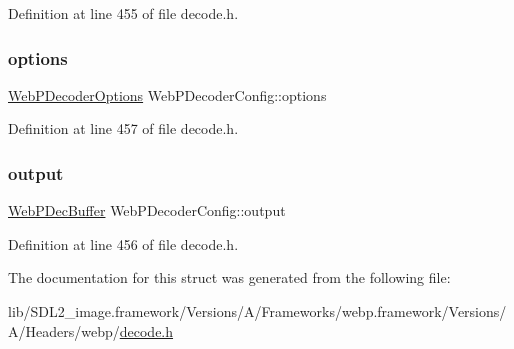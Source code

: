 Definition at line 455 of file decode.\+h.

\mbox{\label{struct_web_p_decoder_config_a06921f434d359574eba37f6aedd33a6a}} 
\subsubsection{\texorpdfstring{options}{options}}
{\footnotesize\ttfamily \mbox{\hyperlink{struct_web_p_decoder_options}{Web\+P\+Decoder\+Options}} Web\+P\+Decoder\+Config\+::options}



Definition at line 457 of file decode.\+h.

\mbox{\label{struct_web_p_decoder_config_abd6e5ba792753fae7e8a123323f343b4}} 
\subsubsection{\texorpdfstring{output}{output}}
{\footnotesize\ttfamily \mbox{\hyperlink{struct_web_p_dec_buffer}{Web\+P\+Dec\+Buffer}} Web\+P\+Decoder\+Config\+::output}



Definition at line 456 of file decode.\+h.



The documentation for this struct was generated from the following file\+:\begin{DoxyCompactItemize}
\item 
lib/\+S\+D\+L2\+\_\+image.\+framework/\+Versions/\+A/\+Frameworks/webp.\+framework/\+Versions/\+A/\+Headers/webp/\mbox{\hyperlink{decode_8h}{decode.\+h}}\end{DoxyCompactItemize}

